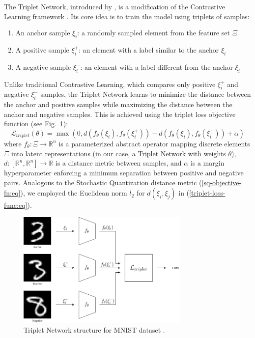 The Triplet Network, introduced by \cite{Hoffer_2015}, is a modification of the Contrastive Learning framework \cite{Khosla_2020}. Its core idea is to train the model using triplets of samples:
\begin{enumerate}
    \item An anchor sample $\xi_i$: a randomly sampled element from the feature set $\Xi$
    \item A positive sample $\xi^+_i$: an element with a label similar to the anchor $\xi_i$
    \item A negative sample $\xi^-_i$: an element with a label different from the anchor $\xi_i$
\end{enumerate}

Unlike traditional Contrastive Learning, which compares only positive $\xi^+_i$ and negative $\xi^-_i$ samples, the Triplet Network learns to minimize the distance between the anchor and positive samples while maximizing the distance between the anchor and negative samples. This is achieved using the triplet loss objective function (see Fig.~\ref{triplet-network:fig}):
\begin{equation}
    \label{triplet-loss-func:eq}
    \mathcal{L}_{triplet}(\theta) = \max (0, d(f_{\theta}(\xi_i), f_{\theta}(\xi^+_i)) - d(f_{\theta}(\xi_i), f_{\theta}(\xi^-_i)) + \alpha)
\end{equation}
\noindent where $f_{\theta}: \Xi \to \mathbb{R}^n$ is a parameterized abstract operator mapping discrete elements $\Xi$ into latent representations (in our case, a Triplet Network with weights $\theta$), $d: [\mathbb{R}^n, \mathbb{R}^n] \to \mathbb{R}$ is a distance metric between samples, and $\alpha$ is a margin hyperparameter enforcing a minimum separation between positive and negative pairs. Analogous to the Stochastic Quantization distance metric (\ref{sq-objective-fn:eq}), we employed the Euclidean norm $l_2$ for $d(\xi_i, \xi_j)$ in (\ref{triplet-loss-func:eq}).
\begin{figure}
    \centering
    \includegraphics[width=0.75\textwidth]{figures/triplet_loss.png}
    \caption{Triplet Network structure for MNIST dataset \cite{lecun2010mnist}.} \label{triplet-network:fig}
\end{figure}

